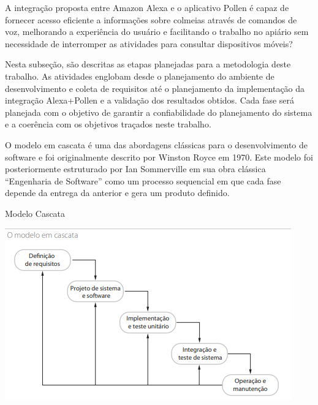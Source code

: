 A integração proposta entre Amazon Alexa e o aplicativo Pollen é capaz de fornecer acesso eficiente 
a informações sobre colmeias através de comandos de voz, melhorando a experiência do usuário 
e facilitando o trabalho no apiário sem necessidade de interromper as atividades para consultar dispositivos móveis?

\label{sec:aplicacao-metodologia}

Nesta subseção, são descritas as etapas planejadas para a metodologia deste trabalho. As atividades englobam desde o planejamento do ambiente de desenvolvimento e coleta de requisitos até o 
planejamento da implementação da integração Alexa+Pollen e a validação dos resultados obtidos. Cada fase será planejada com o objetivo de garantir a confiabilidade do planejamento do sistema e a coerência com os objetivos traçados neste trabalho.

\label{ssec:planejamento-desenvolvimento-solucao}

O modelo em cascata é uma das abordagens clássicas para o desenvolvimento de software e foi originalmente descrito por Winston Royce em 1970. 
Este modelo foi posteriormente estruturado por Ian Sommerville em sua obra clássica “Engenharia de Software” como um processo sequencial em que cada fase depende da entrega da anterior e gera um produto definido.

\begin{figura}{Modelo Cascata}{\textcite{sommerville2011}}
    \begin{flushleft}
        \label{fig:modelo-cascata}
        \includegraphics[width=0.95\linewidth]{resources/floats/ilustracoes/cascata.png}
    \end{flushleft}
\end{figura}

